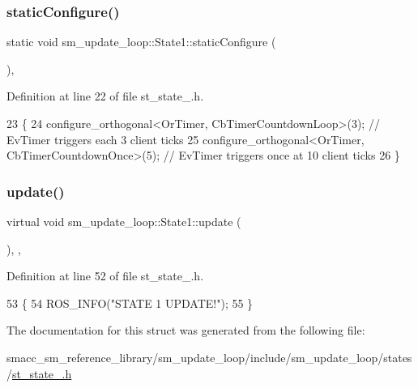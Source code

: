 \subsubsection{\texorpdfstring{static\+Configure()}{staticConfigure()}}
{\footnotesize\ttfamily static void sm\+\_\+update\+\_\+loop\+::\+State1\+::static\+Configure (\begin{DoxyParamCaption}{ }\end{DoxyParamCaption})\hspace{0.3cm}{\ttfamily [inline]}, {\ttfamily [static]}}



Definition at line 22 of file st\+\_\+state\+\_.\+h.


\begin{DoxyCode}
23     \{
24         configure\_orthogonal<OrTimer, CbTimerCountdownLoop>(3); \textcolor{comment}{// EvTimer triggers each 3 client ticks}
25         configure\_orthogonal<OrTimer, CbTimerCountdownOnce>(5); \textcolor{comment}{// EvTimer triggers once at 10 client ticks}
26     \}
\end{DoxyCode}
\mbox{\label{structsm__update__loop_1_1State1_ad31e8291e9ca0d1a4d9dbb76d929c01e}} 
\subsubsection{\texorpdfstring{update()}{update()}}
{\footnotesize\ttfamily virtual void sm\+\_\+update\+\_\+loop\+::\+State1\+::update (\begin{DoxyParamCaption}{ }\end{DoxyParamCaption})\hspace{0.3cm}{\ttfamily [inline]}, {\ttfamily [override]}, {\ttfamily [virtual]}}



Definition at line 52 of file st\+\_\+state\+\_.\+h.


\begin{DoxyCode}
53     \{
54         ROS\_INFO(\textcolor{stringliteral}{"STATE 1 UPDATE!"});
55     \}
\end{DoxyCode}


The documentation for this struct was generated from the following file\+:\begin{DoxyCompactItemize}
\item 
smacc\+\_\+sm\+\_\+reference\+\_\+library/sm\+\_\+update\+\_\+loop/include/sm\+\_\+update\+\_\+loop/states/\hyperlink{sm__update__loop_2include_2sm__update__loop_2states_2st__state__1_8h}{st\+\_\+state\+\_.\+h}\end{DoxyCompactItemize}
